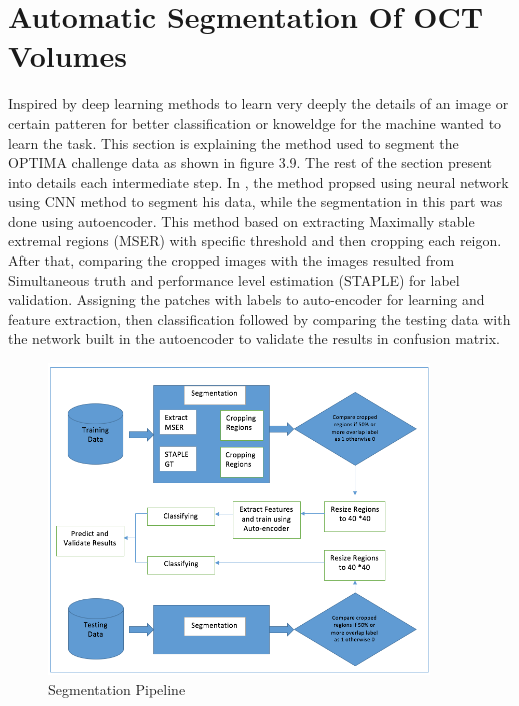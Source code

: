 \section{Automatic Segmentation Of OCT Volumes}
Inspired by deep learning methods to learn very deeply the details of an image or certain patteren for better classification or knoweldge for the machine wanted to learn the task.
This section is explaining the method used to segment the OPTIMA challenge data as shown in figure 3.9.
The rest of the section present into details each intermediate step.
In \cite{venhuizen2015autCNN}, the method propsed using neural network using CNN method to segment his data, while the segmentation in this part was done using autoencoder.
This method based on extracting Maximally stable extremal regions (MSER) with specific threshold and then cropping each reigon.
After that, comparing the cropped images with the images resulted from Simultaneous truth and performance level estimation (STAPLE) for label validation.
Assigning the patches with labels to auto-encoder for learning and feature extraction, then classification followed by comparing the testing data with the network built in the autoencoder to validate the results in confusion matrix.

\begin{figure}[htb]
        \centering
        \includegraphics[width = 0.9\textwidth, height = 0.5\textheight]{figures/Segmentation.png} %
  \caption{Segmentation Pipeline}
  \label{fig:Segmentation Pipeline}
\end{figure} 
